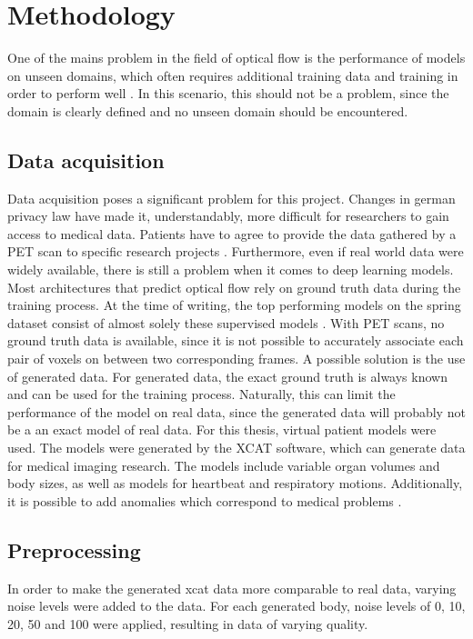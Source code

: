 
\chapter{Methodology}
One of the mains problem in the field of optical flow is the performance of models  on unseen domains, which often requires additional training data and training in order to perform well \cite{hurOpticalFlowEstimation2020}. In this scenario, this should not be a problem, since the domain is clearly defined and no unseen domain should be encountered.

\section{Data acquisition}
Data acquisition poses a significant problem for this project.  Changes in german privacy law have made it, understandably, more difficult for researchers to gain access to medical data. 
Patients have to agree to provide the data gathered by a PET scan to specific research projects \cite{specht-riemenschneiderImAuftragBundesministeriums}.
Furthermore, even if real world data were widely available, there is still a problem when it comes to deep learning models. Most architectures that predict optical flow rely on ground truth data
during the training process. At the time of writing, the top performing models on the spring dataset consist of almost solely these supervised models \cite{mehlSpringHighResolutionHighDetail2023}.
With PET scans, no ground truth data is available, since it is not possible to accurately associate each pair of voxels on between two corresponding frames. A possible solution is the use of generated data. For generated data, the exact ground truth is always known and can be used for the training process. Naturally, this can limit the performance of the model on real data, since the generated data will probably not be a an exact model of real data. For this thesis, virtual patient models were used. The models were generated by the XCAT software, which can generate data for medical imaging research. The models include variable organ volumes and body sizes, as well as models for heartbeat and respiratory motions. Additionally, it is possible to add anomalies which correspond to medical problems \cite{4DExtendedCardiacTorso}.
\section{Preprocessing}
In order to make the generated xcat data more comparable to real data, varying noise levels were added to the data.
For each generated body, noise levels of 0, 10,  20, 50 and 100 were applied, resulting in data of varying quality.

